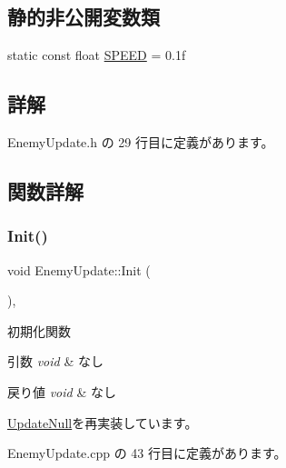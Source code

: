 \subsection*{静的非公開変数類}
\begin{DoxyCompactItemize}
\item 
static const float \mbox{\hyperlink{class_enemy_update_a339b9c72d3144781291bc333dc0c971f}{S\+P\+E\+ED}} = 0.\+1f
\end{DoxyCompactItemize}


\subsection{詳解}


 Enemy\+Update.\+h の 29 行目に定義があります。



\subsection{関数詳解}
\mbox{\label{class_enemy_update_a5b68696e964f71fca73c9143e3770c9d}} 
\subsubsection{\texorpdfstring{Init()}{Init()}}
{\footnotesize\ttfamily void Enemy\+Update\+::\+Init (\begin{DoxyParamCaption}{ }\end{DoxyParamCaption})\hspace{0.3cm}{\ttfamily [override]}, {\ttfamily [virtual]}}



初期化関数 


\begin{DoxyParams}{引数}
{\em void} & なし \\
\hline
\end{DoxyParams}

\begin{DoxyRetVals}{戻り値}
{\em void} & なし \\
\hline
\end{DoxyRetVals}


\mbox{\hyperlink{class_update_null_abe9bc57c7932d2de47073c2709007432}{Update\+Null}}を再実装しています。



 Enemy\+Update.\+cpp の 43 行目に定義があります。

